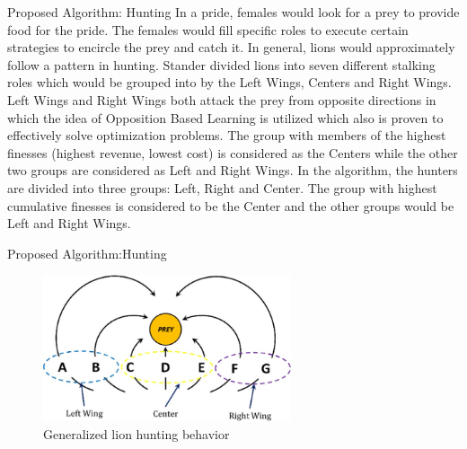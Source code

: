 \documentclass{beamer}
\begin{document}
\begin{frame}{Proposed Algorithm: Hunting}
In a pride, females would look for a prey to provide food for the pride. The females would fill specific roles to execute certain strategies to encircle the prey and catch it. In general, lions would approximately follow a pattern in hunting. Stander divided lions into seven different stalking roles which would be grouped into by the Left Wings, Centers and Right Wings.
Left Wings and Right Wings both attack the prey from opposite directions in which the idea of Opposition Based Learning is utilized which also is proven to effectively solve optimization problems.
The group with members of the highest finesses (highest revenue, lowest cost) is considered as the Centers while the other two groups are considered as Left and Right Wings.
In the algorithm, the hunters are divided into three groups: Left, Right and Center. The group with highest cumulative finesses is considered to be the Center and the other groups would be Left and Right Wings.
\end{frame}
\begin{frame}{Proposed Algorithm:Hunting}
\begin{figure}[h]
\begin{center}
\includegraphics[width=0.65\textwidth]{img/pa/hunting_scheme}
\caption{Generalized lion hunting behavior}
\end{center}
\end{figure}
\end{frame}
\end{document}
